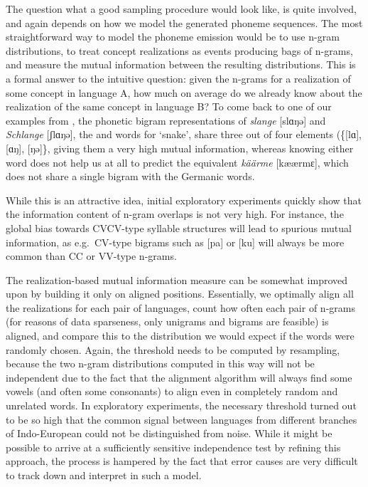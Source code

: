 The question what a good sampling procedure would look like, is quite involved, and again depends on how we model the generated phoneme sequences. The most straightforward way to model the phoneme emission would be to use n-gram distributions, to treat concept realizations as events producing bags of n-grams, and measure the mutual information between the resulting distributions. This is a formal answer to the intuitive question: given the n-grams for a realization of some concept in language A, how much on average do we already know about the realization of the same concept in language B? To come back to one of our examples from , the phonetic bigram representations of \textit{slange} [slɑŋə] and \textit{Schlange} [ʃlɑŋə], the  and  words for `snake', share three out of four elements (\{[lɑ], [ɑŋ], [ŋə]\}, giving them a very high mutual information, whereas knowing either word does not help us at all to predict the  equivalent \textit{käärme} [kæærmɛ], which does not share a single bigram with the Germanic words.

While this is an attractive idea, initial exploratory experiments quickly show that the information content of n-gram overlaps is not very high. For instance, the global bias towards CVCV-type syllable structures will lead to spurious mutual information, as e.g.\ CV-type bigrams such as [pa] or [ku] will always be more common than CC or VV-type n-grams.

The realization-based mutual information measure can be somewhat improved upon by building it only on aligned positions. Essentially, we optimally align all the realizations for each pair of languages, count how often each pair of n-grams (for reasons of data sparseness, only unigrams and bigrams are feasible) is aligned, and compare this to the distribution we would expect if the words were randomly chosen. Again, the threshold needs to be computed by resampling, because the two n-gram distributions computed in this way will not be independent due to the fact that the alignment algorithm will always find some vowels (and often some consonants) to align even in completely random and unrelated words. In exploratory experiments, the necessary threshold turned out to be so high that the common signal between languages from different branches of Indo-European could not be distinguished from noise. While it might be possible to arrive at a sufficiently sensitive independence test by refining this approach, the process is hampered by the fact that error causes are very difficult to track down and interpret in such a model.

